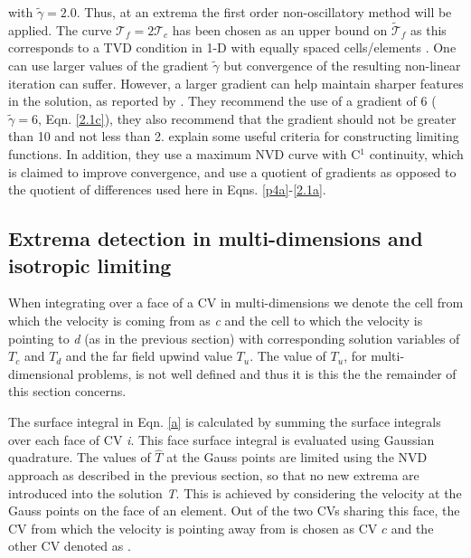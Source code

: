 with $\widetilde{\gamma} = 2.0$. Thus, at an extrema the first order non-oscillatory method will be applied.  The curve $\mathcal{T}_{f} = 2\mathcal{T}_{c}$ has been chosen as an upper bound on $\widetilde{\mathcal{T}}_{f}$ as this corresponds to a TVD condition in 1-D  with equally spaced cells/elements \citep[see][]{hirsch_1990}.  One can use larger values of the gradient $\widetilde{\gamma}$ but convergence of the resulting non-linear iteration can suffer.  However, a larger gradient can help maintain sharper features in the solution, as reported by \citet{jasak_1999}.  They recommend the use of a gradient of 6 ($\widetilde{\gamma} = 6$, Eqn. \ref{2.1c}), they also recommend that the gradient should not be greater than 10 and not less than 2.  \citet{piperno_1998} explain some useful criteria for constructing limiting functions.  In addition, they use a maximum NVD curve with C$^{1}$ continuity, which is claimed to improve convergence, and use a quotient of gradients as opposed to the quotient of differences used here in Eqns. \ref{p4a}-\ref{2.1a}.


\subsection{Extrema detection in multi-dimensions and isotropic limiting}

When integrating over a face of a CV in multi-dimensions we denote the cell from which the velocity is coming from as \textit{c} and the cell to which the velocity is pointing to \textit{d} (as in the previous section) with corresponding solution variables of $T_{c}$ and $T_{d}$ and the far field upwind value $T_{u}$. The value of $T_{u}$, for multi-dimensional  problems, is not well defined and thus it is this the the remainder of this section concerns.

The surface integral in Eqn. \ref{a} is calculated by summing the surface integrals over each face of CV \textit{i}. This face surface integral is evaluated using Gaussian quadrature. The values of $\widehat{T}$ at the Gauss points are limited using the NVD approach as described in the previous section, so that no new extrema are introduced into the solution \textit{T}. This is achieved by considering the velocity at the Gauss points on the face of an element. Out of the two CVs sharing this face, the CV from which the velocity is pointing away from is chosen as CV $c$ and the other CV denoted as .


